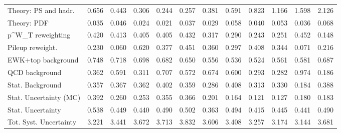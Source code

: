 \begin{tabular}{l|p{0.6cm}p{0.6cm}p{0.6cm}p{0.6cm}p{0.6cm}p{0.6cm}p{0.6cm}p{0.6cm}p{0.6cm}p{0.6cm}p{0.6cm}}
Theory: PS and hadr.                     & 0.656 & 0.443 & 0.306 & 0.244 & 0.257 & 0.381 & 0.591 & 0.823 & 1.166 & 1.598 & 2.126 \\
Theory: PDF                              & 0.035 & 0.046 & 0.024 & 0.021 & 0.037 & 0.029 & 0.058 & 0.040 & 0.053 & 0.036 & 0.068 \\
p^{W}_{T} reweighting                    & 0.420 & 0.413 & 0.405 & 0.405 & 0.432 & 0.317 & 0.290 & 0.243 & 0.251 & 0.452 & 0.148 \\
Pileup reweight.                         & 0.230 & 0.060 & 0.620 & 0.377 & 0.451 & 0.360 & 0.297 & 0.408 & 0.344 & 0.071 & 0.216 \\
EWK+top background                       & 0.748 & 0.718 & 0.698 & 0.682 & 0.650 & 0.556 & 0.536 & 0.524 & 0.561 & 0.581 & 0.687 \\
QCD background                           & 0.362 & 0.591 & 0.311 & 0.707 & 0.572 & 0.674 & 0.600 & 0.293 & 0.282 & 0.974 & 0.186 \\
Stat. Background                         & 0.357 & 0.367 & 0.362 & 0.402 & 0.359 & 0.286 & 0.408 & 0.313 & 0.330 & 0.184 & 0.388 \\
Stat. Uncertainty (MC)                   & 0.392 & 0.260 & 0.253 & 0.355 & 0.366 & 0.201 & 0.164 & 0.121 & 0.127 & 0.180 & 0.183 \\
\hline
Stat. Uncertainty                        & 0.538 & 0.449 & 0.440 & 0.490 & 0.502 & 0.363 & 0.494 & 0.415 & 0.445 & 0.441 & 0.490 \\
\hline
Tot. Syst. Uncertainty                   & 3.221 & 3.441 & 3.672 & 3.713 & 3.832 & 3.606 & 3.408 & 3.257 & 3.174 & 3.144 & 3.681 \\
\hline
\end{tabular}
